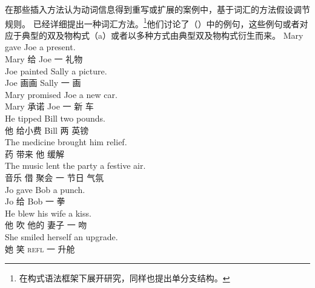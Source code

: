     在那些插入方法认为动词信息得到重写或扩展的案例中，基于词汇的方法假设调节规则。 \citet[\S~4]{BC99a}已经详细提出一种词汇方法。\footnote{\citet{Kay2005a}在构式语法框架下展开研究，同样也提出单分支结构。}他们讨论了（）中的例句，这些例句或者对应于典型的双及物构式（a）或者以多种方式由典型双及物构式衍生而来。
\eal
\ex 
\gll Mary gave Joe a present.\\
Mary 给 Joe 一 礼物\\
\ex\label{paint} 
\gll Joe painted Sally a picture.\\
Joe 画画 Sally 一 画\\
\ex 
\gll Mary promised Joe a new car.\\
Mary 承诺 Joe 一 新 车\\
\ex 
\gll He tipped Bill two pounds.\\
他 给小费 Bill 两 英镑\\
\ex 
\gll The medicine brought him relief.\\
 药 带来 他 缓解\\
\ex 
\gll The music lent the party a festive air.\\
 音乐 借  聚会 一 节日 气氛\\
\ex 
\gll Jo gave Bob a punch.\\
Jo 给 Bob 一 拳\\
\ex 
\gll He blew his wife a kiss.\\
他 吹 他的 妻子 一 吻\\
\ex\label{ex-smiled-herself-an-upgrade} 
\gll She smiled herself an upgrade.\\
她 笑  \textsc{refl} 一 升舱\\
